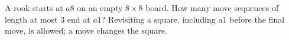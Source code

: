 A rook starts at $a8$ on an empty $8\times8$ board. How many move sequences of length at most 3 end at $a1$? Revisiting a square, including $a1$ before the final move, is allowed; a move changes the square.
